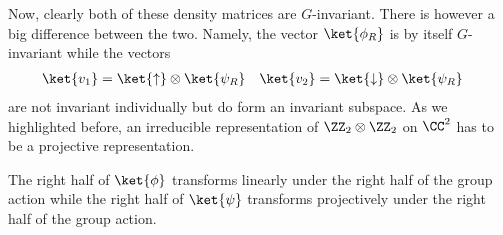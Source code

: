 Now, clearly both of these density matrices are $G$-invariant. There is however a big difference between the two. Namely, the vector $\ket{\phi_R}$ is by itself $G$-invariant while the vectors
\begin{align}
\ket{v_1}&=\ket{\uparrow}\otimes\ket{\psi_R}&\ket{v_2}&=\ket{\downarrow}\otimes\ket{\psi_R}
\end{align}
are not invariant individually but do form an invariant subspace. As we highlighted before, an irreducible representation of $\ZZ_2\otimes\ZZ_2$ on $\CC^2$ has to be a projective representation.
\begin{conclusion}
	The right half of $\ket{\phi}$ transforms linearly under the right half of the group action while the right half of $\ket{\psi}$ transforms projectively under the right half of the group action.
\end{conclusion}
